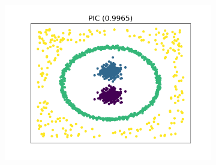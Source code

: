 \begin{figure}[htb]
\begin{subfigure}[b]{0.32\textwidth}
        \includegraphics[width=\textwidth]{../results/plots/dataset_0/PIC_clustering.png}
    \end{subfigure}


\end{figure}
